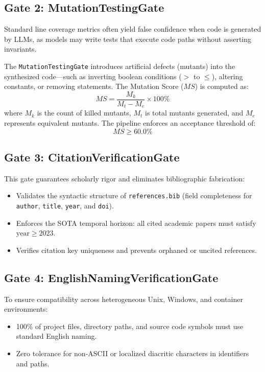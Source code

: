 \subsection{Gate 2: MutationTestingGate}
Standard line coverage metrics often yield false confidence when code is generated by LLMs, as models may write tests that execute code paths without asserting invariants.

The \texttt{MutationTestingGate} introduces artificial defects (mutants) into the synthesized code—such as inverting boolean conditions ($>$ to $\le$), altering constants, or removing statements. The Mutation Score ($MS$) is computed as:
\begin{equation}
    MS = \frac{M_k}{M_t - M_e} \times 100\%
    \label{eq:mutation_score_en}
\end{equation}
where $M_k$ is the count of killed mutants, $M_t$ is total mutants generated, and $M_e$ represents equivalent mutants. The pipeline enforces an acceptance threshold of:
\begin{equation}
    MS \ge 60.0\%
\end{equation}

\subsection{Gate 3: CitationVerificationGate}
This gate guarantees scholarly rigor and eliminates bibliographic fabrication:
\begin{itemize}
    \item Validates the syntactic structure of \texttt{references.bib} (field completeness for \texttt{author}, \texttt{title}, \texttt{year}, and \texttt{doi}).
    \item Enforces the SOTA temporal horizon: all cited academic papers must satisfy $\text{year} \ge 2023$.
    \item Verifies citation key uniqueness and prevents orphaned or uncited references.
\end{itemize}

\subsection{Gate 4: EnglishNamingVerificationGate}
To ensure compatibility across heterogeneous Unix, Windows, and container environments:
\begin{itemize}
    \item 100\% of project files, directory paths, and source code symbols must use standard English naming.
    \item Zero tolerance for non-ASCII or localized diacritic characters in identifiers and paths.
\end{itemize}

